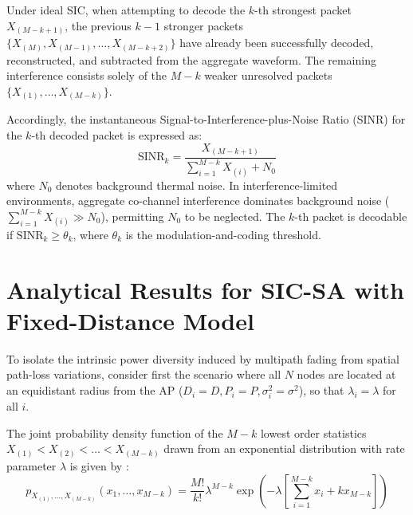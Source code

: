 Under ideal SIC, when attempting to decode the $k$-th strongest packet $X_{(M-k+1)}$, the previous $k - 1$ stronger packets $\{X_{(M)}, X_{(M-1)}, \dots, X_{(M-k+2)}\}$ have already been successfully decoded, reconstructed, and subtracted from the aggregate waveform. The remaining interference consists solely of the $M - k$ weaker unresolved packets $\{X_{(1)}, \dots, X_{(M-k)}\}$. 

Accordingly, the instantaneous Signal-to-Interference-plus-Noise Ratio (SINR) for the $k$-th decoded packet is expressed as:
\begin{equation}
    \text{SINR}_k = \frac{X_{(M-k+1)}}{\sum_{i=1}^{M-k} X_{(i)} + N_0}
\end{equation}
where $N_0$ denotes background thermal noise. In interference-limited environments, aggregate co-channel interference dominates background noise ($\sum_{i=1}^{M-k} X_{(i)} \gg N_0$), permitting $N_0$ to be neglected. The $k$-th packet is decodable if $\text{SINR}_k \ge \theta_k$, where $\theta_k$ is the modulation-and-coding threshold.

\section{Analytical Results for SIC-SA with Fixed-Distance Model}
To isolate the intrinsic power diversity induced by multipath fading from spatial path-loss variations, consider first the scenario where all $N$ nodes are located at an equidistant radius from the AP ($D_i = D, P_i = P, \sigma_i^2 = \sigma^2$), so that $\lambda_i = \lambda$ for all $i$.

The joint probability density function of the $M - k$ lowest order statistics $X_{(1)} < X_{(2)} < \dots < X_{(M-k)}$ drawn from an exponential distribution with rate parameter $\lambda$ is given by \cite{gupta2022sic}:
\begin{equation}
    p_{X_{(1)}, \dots, X_{(M-k)}}(x_1, \dots, x_{M-k}) = \frac{M!}{k!} \lambda^{M-k} \exp\left( -\lambda \left[ \sum_{i=1}^{M-k} x_i + k x_{M-k} \right] \right)
\end{equation}

